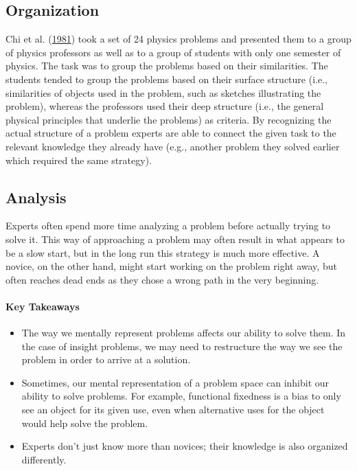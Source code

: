 \documentclass[
]{krantz}
\providecommand{\tightlist}{%
  \setlength{\itemsep}{0pt}\setlength{\parskip}{0pt}}
\begin{document}
\hypertarget{organization}{%
\subsection*{Organization}\label{organization}}


Chi et al. (\protect\hyperlink{ref-Chi1981}{1981}) took a set of 24 physics problems and presented them to a group of physics professors as well as to a group of students with only one semester of physics. The task was to group the problems based on their similarities. The students tended to group the problems based on their surface structure (i.e., similarities of objects used in the problem, such as sketches illustrating the problem), whereas the professors used their deep structure (i.e., the general physical principles that underlie the problems) as criteria. By recognizing the actual structure of a problem experts are able to connect the given task to the relevant knowledge they already have (e.g., another problem they solved earlier which required the same strategy).

\hypertarget{analysis}{%
\subsection*{Analysis}\label{analysis}}


Experts often spend more time analyzing a problem before actually trying to solve it. This way of approaching a problem may often result in what appears to be a slow start, but in the long run this strategy is much more effective. A novice, on the other hand, might start working on the problem right away, but often reaches dead ends as they chose a wrong path in the very beginning.

\hypertarget{key-takeaways-9}{%
\paragraph*{Key Takeaways}\label{key-takeaways-9}}

\begin{itemize}
\tightlist
\item
  The way we mentally represent problems affects our ability to solve them. In the case of insight problems, we may need to restructure the way we see the problem in order to arrive at a solution.
\item
  Sometimes, our mental representation of a problem space can inhibit our ability to solve problems. For example, functional fixedness is a bias to only see an object for its given use, even when alternative uses for the object would help solve the problem.
\item
  Experts don't just know more than novices; their knowledge is also organized differently.
\end{itemize}
\end{document}
